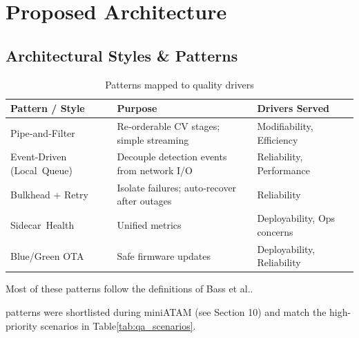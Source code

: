 \documentclass[11pt,a4paper]{article}
\begin{document}
\section{Proposed Architecture}

\subsection{Architectural Styles \& Patterns}

\begin{table}[h!]
\centering
\setlength{\extrarowheight}{2pt}
\begin{tabular}{|p{3.4cm}|p{5.2cm}|p{4cm}|}
\hline
\textbf{Pattern / Style} & \textbf{Purpose} & \textbf{Drivers Served} \\ \hline
Pipe‑and‑Filter & Re‑orderable CV stages; simple streaming & Modifiability, Efficiency \\ \hline
Event‑Driven (Local Queue) & Decouple detection events from network I/O & Reliability, Performance \\ \hline
Bulkhead + Retry & Isolate failures; auto‑recover after outages & Reliability \\ \hline
Sidecar Health & Unified metrics & Deployability, Ops concerns \\ \hline
Blue/Green OTA & Safe firmware updates & Deployability, Reliability \\ \hline
\end{tabular}
\caption{Patterns mapped to quality drivers}
\label{tab:pattern_mapping}
\end{table}
Most of these patterns follow the definitions of Bass et al.\cite{bass2013}.

\noindentThese patterns were shortlisted during miniATAM (see Section 10) and match the high-priority scenarios in Table\ref{tab:qa_scenarios}.
\end{document}
